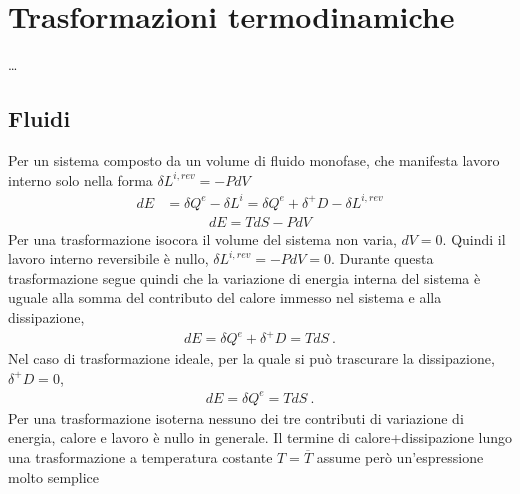 \documentclass[letterpaper,10pt,italian]{jupyterBook}
\begin{document}
\section{Trasformazioni termodinamiche}
\label{\detokenize{ch/thermodynamics/heat-engine-td-transformations:trasformazioni-termodinamiche}}\label{\detokenize{ch/thermodynamics/heat-engine-td-transformations:physics-hs-thermodynamics-heat-engine-td-cycles}}\label{\detokenize{ch/thermodynamics/heat-engine-td-transformations::doc}}
\sphinxAtStartPar
…


\subsection{Fluidi}
\label{\detokenize{ch/thermodynamics/heat-engine-td-transformations:fluidi}}
\sphinxAtStartPar
Per un sistema  composto da un volume di fluido monofase, che manifesta lavoro interno solo nella forma \(\delta L^{i,rev} = -P dV\)
\begin{equation*}
\begin{split}d E & = \delta Q^e - \delta L^i = \delta Q^e + \delta^+ D - \delta L^{i, rev} \end{split}
\end{equation*}\begin{equation*}
\begin{split}d E = T d S - P d V\end{split}
\end{equation*}
\sphinxAtStartPar
{} Per una trasformazione isocora il volume del sistema non varia, \(d V = 0\). Quindi il lavoro interno reversibile è nullo, \(\delta L^{i,rev} = - P dV = 0\). Durante questa trasformazione segue quindi che la variazione di energia interna del sistema è uguale alla somma del contributo del calore immesso nel sistema e alla dissipazione,
\begin{equation*}
\begin{split}d E = \delta Q^e + \delta^+ D = T dS \ .\end{split}
\end{equation*}
\sphinxAtStartPar
Nel caso di trasformazione ideale, per la quale si può trascurare la dissipazione, \(\delta^+ D = 0\),
\begin{equation*}
\begin{split}d E = \delta Q^e = T dS \ .\end{split}
\end{equation*}
\sphinxAtStartPar
{} Per una trasformazione isoterna nessuno dei tre contributi di variazione di energia, calore e lavoro è nullo in generale. Il termine di calore+dissipazione lungo una trasformazione a temperatura costante \(T = \overline{T}\) assume però un’espressione molto semplice
\end{document}
